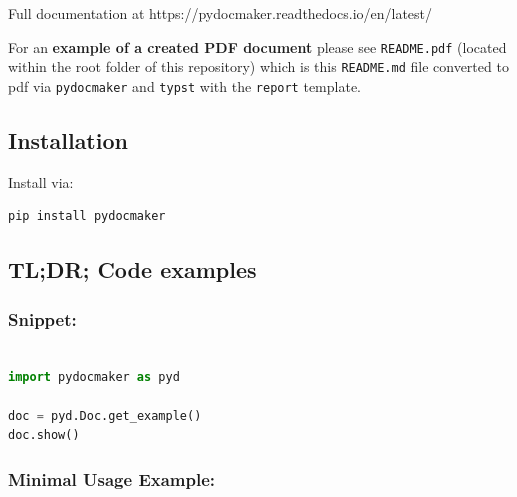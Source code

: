 \documentclass[a4paper]{article}
\begin{document}
Full documentation at https://pydocmaker.readthedocs.io/en/latest/

For an \textbf{example of a created PDF document} please see \passthrough{\lstinline!README.pdf!} (located within the root folder of this repository) which is this \passthrough{\lstinline!README.md!} file converted to pdf via \passthrough{\lstinline!pydocmaker!} and \passthrough{\lstinline!typst!} with the \passthrough{\lstinline!report!} template.

\subsection{Installation}\label{installation}

Install via:

\begin{lstlisting}[language=bash]
pip install pydocmaker
\end{lstlisting}

\subsection{TL;DR; Code examples}\label{tldr-code-examples}

\subsubsection{Snippet:}\label{snippet}

\begin{lstlisting}[language=Python]

import pydocmaker as pyd

doc = pyd.Doc.get_example()
doc.show()
\end{lstlisting}

\subsubsection{Minimal Usage Example:}\label{minimal-usage-example}
\end{document}
